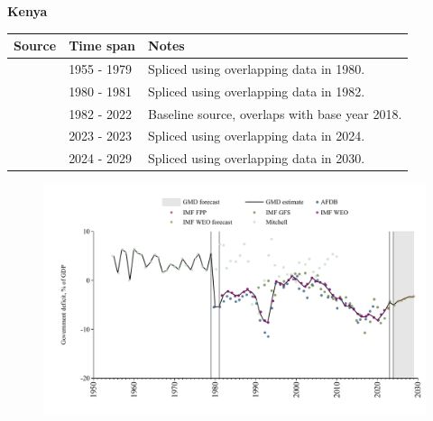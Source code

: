 \documentclass[12pt,a4paper,landscape]{article}
\begin{document}
\begin{adjustbox}{max totalsize={\paperwidth}{\paperheight},center}
\begin{minipage}[t][\textheight][t]{\textwidth}
\vspace*{0.5cm}
{}
\begin{center}
{\Large\bfseries Kenya}
\end{center}
\vspace{0.5cm}
\begin{table}[H]
\centering
\small
\begin{tabular}{|l|l|l|}
\hline
\textbf{Source} & \textbf{Time span} & \textbf{Notes} \\
\hline
\rowcolor{white}\cite{Mitchell}& 1955 - 1979 &Spliced using overlapping data in 1980.\\
\rowcolor{lightgray}\cite{AFDB}& 1980 - 1981 &Spliced using overlapping data in 1982.\\
\rowcolor{white}\cite{IMF_WEO}& 1982 - 2022 &Baseline source, overlaps with base year 2018.\\
\rowcolor{lightgray}\cite{IMF_GFS}& 2023 - 2023 &Spliced using overlapping data in 2024.\\
\rowcolor{white}\cite{IMF_WEO_forecast}& 2024 - 2029 &Spliced using overlapping data in 2030.\\
\hline
\end{tabular}
\end{table}
\begin{figure}[H]
\centering
\includegraphics[width=\textwidth,height=0.6\textheight,keepaspectratio]{graphs/KEN_govdef_GDP.pdf}
\end{figure}
\end{minipage}
\end{adjustbox}
\end{document}
